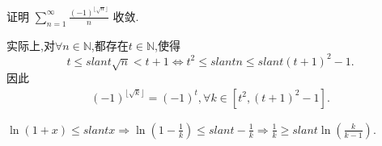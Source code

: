 \documentclass[../../main.tex]{subfiles}
\begin{document}
\begin{example}
证明 $\sum_{n=1}^{\infty} \frac{(-1)^{\lfloor \sqrt{n} \rfloor}}{n}$ 收敛.
\end{example}
\begin{remark}
实际上,对$\forall n\in \mathbb{N}$,都存在$t\in \mathbb{N}$,使得$$t\leqslant slant \sqrt{n}<t+1\iff t^2\leqslant slant n\leqslant slant (t+1)^2-1.$$
因此
\begin{align*}
(-1)^{\lfloor \sqrt{k} \rfloor}=(-1)^t,\forall k\in [t^2,(t+1)^2-1].
\end{align*}
\end{remark}
\begin{remark}
$\ln \left( 1+x \right) \leqslant slant x\Rightarrow \ln \left( 1-\frac{1}{k} \right) \leqslant slant -\frac{1}{k}\Rightarrow \frac{1}{k}\geqslant slant \ln \left( \frac{k}{k-1} \right) .$
\end{remark}
\end{document}
